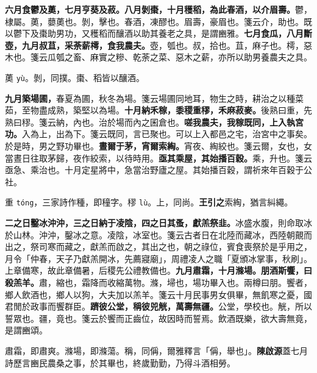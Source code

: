\textbf{六月食鬱及薁，七月亨葵及菽。八月剝棗，十月穫稻，為此春酒，以介眉壽。}{\footnotesize 鬱，棣屬。薁，蘡薁也。剝，擊也。春酒，凍醪也。眉壽，豪眉也。箋云介，助也。既以鬱下及棗助男功，又穫稻而釀酒以助其養老之具，是謂豳雅。}\textbf{七月食瓜，八月斷壺，九月叔苴，采荼薪樗，食我農夫。}{\footnotesize 壺，瓠也。叔，拾也。苴，麻子也。樗，惡木也。箋云瓜瓠之畜、麻實之糝、乾荼之菜、惡木之薪，亦所以助男養農夫之具。}

\begin{quoting}薁 \texttt{yù}。剝，同撲。棗、稻皆以釀酒。\end{quoting}

\textbf{九月築場圃，}{\footnotesize 春夏為圃，秋冬為場。箋云場圃同地耳，物生之時，耕治之以種菜茹，至物盡成熟，築堅以為場。}\textbf{十月納禾稼，黍稷重穋，禾麻菽麥。}{\footnotesize 後熟曰重，先熟曰穋。箋云納，內也。治於場而內之囷倉也。}\textbf{嗟我農夫，我稼既同，上入執宮功。}{\footnotesize 入為上，出為下。箋云既同，言已聚也。可以上入都邑之宅，治宮中之事矣。於是時，男之野功畢也。}\textbf{晝爾于茅，宵爾索綯。}{\footnotesize 宵夜、綯絞也。箋云爾，女也，女當晝日往取茅歸，夜作絞索，以待時用。}\textbf{亟其乘屋，其始播百穀。}{\footnotesize 乘，升也。箋云亟急、乘治也。十月定星將中，急當治野廬之屋。其始播百穀，謂祈來年百穀于公社。}

\begin{quoting}重 \texttt{tóng}，三家詩作種，即穜字。穋 \texttt{lù}。上，同尚。\textbf{王引之}索綯，猶言糾繩。\end{quoting}

\textbf{二之日鑿冰沖沖，三之日納于凌陰，四之日其蚤，獻羔祭韭。}{\footnotesize 冰盛水腹，則命取冰於山林。沖沖，鑿冰之意。凌陰，冰室也。箋云古者日在北陸而藏冰，西陸朝覿而出之，祭司寒而藏之，獻羔而啟之，其出之也，朝之祿位，賓食喪祭於是乎用之，月令「仲春，天子乃獻羔開冰，先薦寢廟」，周禮凌人之職「夏頒冰掌事，秋刷」。上章備寒，故此章備暑，后稷先公禮教備也。}\textbf{九月肅霜，十月滌場。朋酒斯饗，曰殺羔羊。}{\footnotesize 肅，縮也，霜降而收縮萬物。滌，埽也，場功畢入也。兩樽曰朋。饗者，鄉人飲酒也，鄉人以狗，大夫加以羔羊。箋云十月民事男女俱畢，無飢寒之憂，國君閒於政事而饗群臣。}\textbf{躋彼公堂，稱彼兕觥，萬壽無疆。}{\footnotesize 公堂，學校也。觥，所以誓眾也。疆，竟也。箋云於饗而正齒位，故因時而誓焉。飲酒既樂，欲大壽無竟，是謂豳頌。}

\begin{quoting}肅霜，即肅爽。滌場，即滌蕩。稱，同偁，爾雅釋言「偁，舉也」。\textbf{陳啟源}蓋七月詩歷言豳民農桑之事，於其畢也，終歲勤勤，乃得斗酒相勞。\end{quoting}

